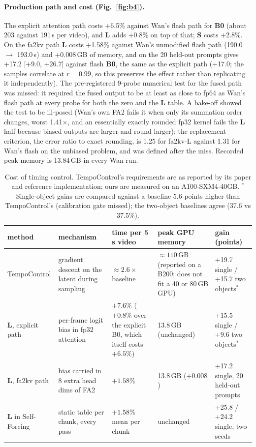 \documentclass[10pt,a4paper]{article}
\newcommand{\arm}[1]{\textbf{#1}}
\begin{document}
\paragraph{Production path and cost (Fig.~\ref{fig:b4}).} The explicit attention path costs +6.5\% against Wan's flash path for \arm{B0} (about 203 against 191\,s per video), and \arm{L} adds +0.8\% on top of that; \arm{S} costs +2.8\%. On the fa2kv path \arm{L} costs +1.58\% against Wan's unmodified flash path (190.0 $\to$ 193.0\,s) and +0.008\,GB of memory, and on the 20 held-out prompts gives +17.2 [+9.0, +26.7] against flash \arm{B0}, the same as the explicit path (+17.0; the samples correlate at $r=0.99$, so this preserves the effect rather than replicating it independently). The pre-registered 9-probe numerical test for the fused path was missed: it required the fused output to be at least as close to fp64 as Wan's flash path at every probe for both the zero and the \arm{L} table. A bake-off showed the test to be ill-posed (Wan's own FA2 fails it when only its summation order changes, worst 1.41$\times$, and an essentially exactly rounded fp32 kernel fails the \arm{L} half because biased outputs are larger and round larger); the replacement criterion, the error ratio to exact rounding, is 1.25 for fa2kv-L against 1.31 for Wan's flash on the unbiased problem, and was defined after the miss. Recorded peak memory is 13.84\,GB in every Wan run.

\begin{table}[htbp]\centering\small
\caption{Cost of timing control. TempoControl's requirements are as reported by its paper and reference implementation; ours are measured on an A100-SXM4-40GB. $^{*}$Single-object gains are compared against a baseline 5.6 points higher than TempoControl's (calibration gate missed); the two-object baselines agree (37.6 vs 37.5\%).}
\label{tab:cost}
\begin{tabularx}{\textwidth}{lYYYY}\toprule
method & mechanism & time per 5\,s video & peak GPU memory & gain (points)\\\midrule
TempoControl & gradient descent on the latent during sampling & $\approx2.6\times$ baseline & $\approx110$\,GB (reported on a B200; does not fit a 40 or 80\,GB GPU) & +19.7 single / +15.7 two objects$^{*}$\\
\arm{L}, explicit path & per-frame logit bias in fp32 attention & $+7.6\%$ ($+0.8\%$ over the explicit B0, which itself costs $+6.5\%$) & 13.8\,GB (unchanged) & +15.5 single / +9.6 two objects$^{*}$\\
\arm{L}, fa2kv path & bias carried in 8 extra head dims of FA2 & $+1.58\%$ & 13.8\,GB ($+0.008$) & +17.2 single, 20 held-out prompts\\
\arm{L} in Self-Forcing & static table per chunk, every pass & $+1.58\%$ mean per chunk & unchanged & +25.8 / +24.2 single, two seeds\\
\bottomrule\end{tabularx}
\end{table}
\end{document}
